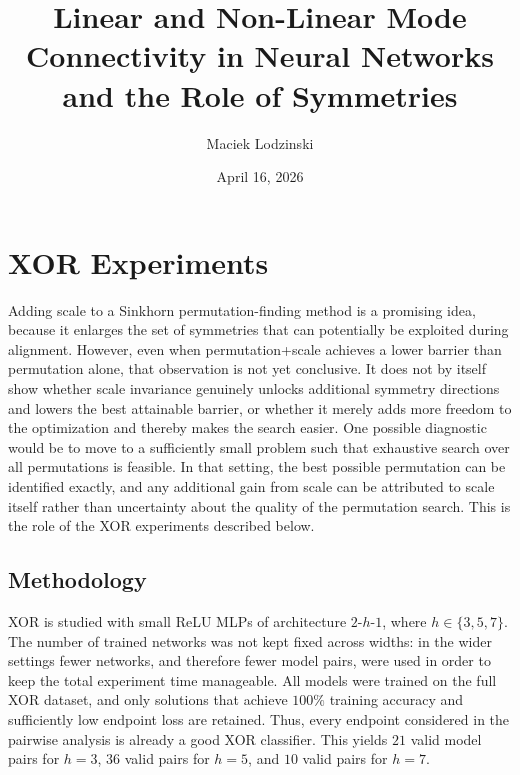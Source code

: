 \documentclass[11pt,a4paper]{article}
\title{Linear and Non-Linear Mode Connectivity in Neural Networks\\and the Role of Symmetries\\ \vspace{0.3cm}}
\author{Maciek Lodzinski}
\date{April 16, 2026}
\begin{document}
\maketitle

\section{XOR Experiments}
Adding scale to a Sinkhorn permutation-finding method is a promising idea, because it enlarges the set of symmetries that can potentially be exploited during alignment. However, even when permutation+scale achieves a lower barrier than permutation alone, that observation is not yet conclusive. It does not by itself show whether scale invariance genuinely unlocks additional symmetry directions and lowers the best attainable barrier, or whether it merely adds more freedom to the optimization and thereby makes the search easier. One possible diagnostic would be to move to a sufficiently small problem such that exhaustive search over all permutations is feasible. In that setting, the best possible permutation can be identified exactly, and any additional gain from scale can be attributed to scale itself rather than uncertainty about the quality of the permutation search. This is the role of the XOR experiments described below.

\subsection{Methodology}
XOR is studied with small ReLU MLPs of architecture $2$-$h$-$1$, where $h \in \{3,5,7\}$. The number of trained networks was not kept fixed across widths: in the wider settings fewer networks, and therefore fewer model pairs, were used in order to keep the total experiment time manageable. All models were trained on the full XOR dataset, and only solutions that achieve $100\%$ training accuracy and sufficiently low endpoint loss are retained. Thus, every endpoint considered in the pairwise analysis is already a good XOR classifier. This yields $21$ valid model pairs for $h=3$, $36$ valid pairs for $h=5$, and $10$ valid pairs for $h=7$.
\end{document}

